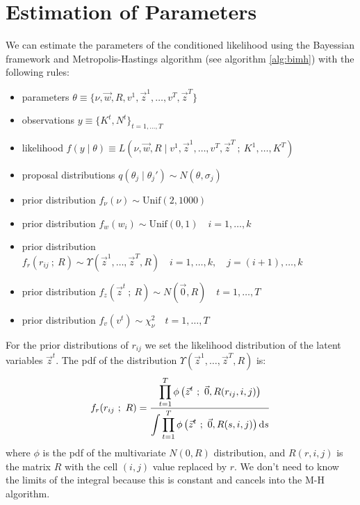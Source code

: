 \documentclass[11pt,fleqn]{book} %
\begin{document}
\section{Estimation of Parameters}

\begin{proposition}
	We can estimate the parameters of the conditioned likelihood using
	the Bayessian framework and Metropolis-Hastings algorithm 
	(see algorithm \ref{alg:bimh}) with the following rules:
	\begin{itemize}
		\item parameters $\theta \equiv \{ \nu,\vec{w},R,v^1,\vec{z}^1,\dots,v^T,\vec{z}^T\}$
		\item observations $y \equiv \{K^t, N^t\}_{t=1,\dots,T}$
		\item likelihood $f(y \mid \theta) \equiv L(\nu,\vec{w},R  \mid  v^1,\vec{z}^1,\dots,v^T,\vec{z}^T\ ;\ K^1,\dots,K^T)$
		\item proposal distributions $q(\theta_j \mid \theta_j') \sim N(\theta,\sigma_j)$
		\item prior distribution $f_{\nu}(\nu) \sim \text{Unif}(2,1000)$
		\item prior distribution $f_{w}(w_i) \sim \text{Unif}(0,1) \quad i=1,\dots,k$
		\item prior distribution $f_{r}(r_{ij}\ ;\ R) \sim \Upsilon(\vec{z}^1,\dots,\vec{z}^T,R) \quad i=1,\dots,k, \quad j=(i+1),\dots,k$
		\item prior distribution $f_z(\vec{z}^t\ ;\ R) \sim N(\vec{0},R) \quad t=1,\dots,T$
		\item prior distribution $f_v(v^t) \sim \chi_{\nu}^2 \quad t=1,\dots,T$
	\end{itemize}
	For the prior distributions of $r_{ij}$ we set the likelihood distribution
	of the latent variables $\vec{z}^t$. The pdf of the distribution 
	$\Upsilon(\vec{z}^1,\dots,\vec{z}^T,R)$ is:
	\begin{displaymath}
		f_r(r_{ij}\ ;\ R) = \frac
		{\displaystyle \prod_{t=1}^{T} \phi\left( \vec{z}^t\ ;\ \vec{0}, R(r_{ij},i,j) \right)}
		{\displaystyle \int \prod_{t=1}^{T} \phi\left( \vec{z}^t\ ;\ \vec{0}, R(s,i,j) \right) \ud s}
	\end{displaymath}
	where $\phi$ is the pdf of the multivariate $N(0,R)$ distribution,
	and $R(r,i,j)$ is the matrix $R$ with the cell $(i,j)$ value 
	replaced by $r$. We don't need to know the limits of the integral
	because this is constant and cancels into the M-H algorithm.
\end{proposition}
\end{document}
